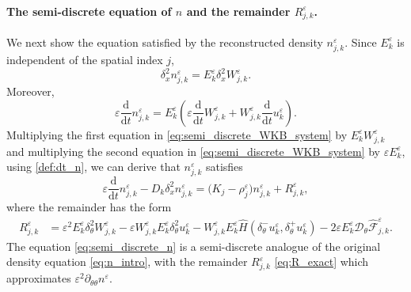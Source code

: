 \documentclass[11pt]{article}
\numberwithin{equation}{section}
\begin{document}
\paragraph{The semi-discrete equation of $n$ and the remainder $R_{j,k}^\varepsilon$. }
We next show the equation satisfied by the reconstructed density
\(n_{j,k}^\varepsilon\). Since \(E_k^\varepsilon\) is independent of the
spatial index \(j\),
\[
\delta_x^2 n_{j,k}^\varepsilon
=
E_k^\varepsilon\delta_x^2W_{j,k}^\varepsilon .
\]
Moreover,
\begin{equation}\label{def:dt_n}
\varepsilon\frac{\mathrm d}{\mathrm dt}n_{j,k}^\varepsilon
=
E_k^\varepsilon
\left(
\varepsilon\frac{\mathrm d}{\mathrm dt}W_{j,k}^\varepsilon
+
W_{j,k}^\varepsilon
\frac{\mathrm d}{\mathrm dt}u_k^\varepsilon
\right).
\end{equation}
Multiplying the first equation in \eqref{eq:semi_discrete_WKB_system} by $E_k^\varepsilon W_{j,k}^\varepsilon$ and multiplying the second equation in  \eqref{eq:semi_discrete_WKB_system} by $\varepsilon E_k^\varepsilon$, 
using \eqref{def:dt_n},
we can derive that \(n_{j,k}^\varepsilon\) satisfies
\begin{equation}\label{eq:semi_discrete_n}
\varepsilon\frac{\mathrm d}{\mathrm dt} n_{j,k}^\varepsilon
-
D_k\delta_x^2 n_{j,k}^\varepsilon
=
\bigl(K_j-\rho_{j}^\varepsilon\bigr)n_{j,k}^\varepsilon
+
R_{j,k}^\varepsilon ,
\end{equation}
where the remainder has the form 
\begin{align} 
R_{j,k}^\varepsilon
&=
\varepsilon^2
E_k^\varepsilon
\delta_\theta^2 W_{j,k}^\varepsilon
-
\varepsilon
W_{j,k}^\varepsilon
E_k^\varepsilon
\delta_\theta^2 u_k^\varepsilon
-
W_{j,k}^\varepsilon
E_k^\varepsilon
\widehat H
\left(
\delta_\theta^-u_k^\varepsilon,
\delta_\theta^+u_k^\varepsilon
\right)
-
2\varepsilon
E_k^\varepsilon
\mathcal D_\theta
\widehat{\mathcal F}^\varepsilon_{j,k}.
\label{eq:R_exact}
\end{align}
The equation \eqref{eq:semi_discrete_n} is a semi-discrete analogue of the
original density equation \eqref{eq:n_intro}, with the remainder \(R_{j,k}^\varepsilon\) \eqref{eq:R_exact} which approximates
\(\varepsilon^2\partial_{\theta\theta}n^\varepsilon\). 





\end{document}
